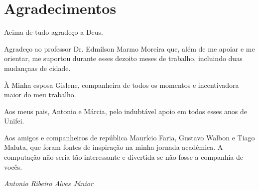 \chapter*{Agradecimentos}

Acima de tudo agradeço a Deus.

Agradeço ao professor Dr. Edmilson Marmo Moreira que, além de me apoiar e me orientar, me suportou durante esses dezoito meses de trabalho, incluindo duas mudançaas de cidade.

À Minha esposa Gislene, companheira de todos os momentos e incentivadora maior do meu trabalho.

Aos meus pais, Antonio e Márcia, pelo indubtável apoio em todos esses anos de Unifei.

Aos amigos e companheiros de república Maurício Faria, Gustavo Walbon e Tiago Maluta, que foram fontes de inspiração na minha jornada acadêmica. A computação não seria tão interessante e divertida se não fosse a companhia de vocês.

\textit{Antonio Ribeiro Alves Júnior}

